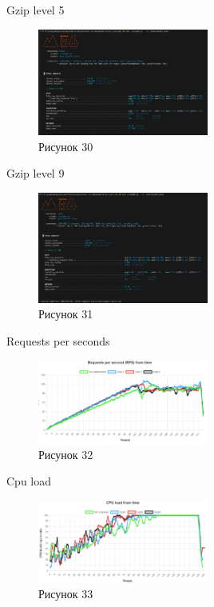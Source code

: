 \documentclass[12pt]{article}
\begin{document}
    Gzip level 5
    \begin{figure}[h!]
        \centering
        \includegraphics[width=0.5\textwidth]{../images/second_part/gzip5_screenshot.png}
        \caption{Рисунок 30}
    \end{figure}

    Gzip level 9
    \begin{figure}[h!]
        \centering
        \includegraphics[width=0.5\textwidth]{../images/second_part/gzip9_screenshot.png}
        \caption{Рисунок 31}
    \end{figure}

    Requests per seconds
    \begin{figure}[h!]
        \centering
        \includegraphics[width=0.5\textwidth]{../images/second_part/RPS.png}
        \caption{Рисунок 32}
    \end{figure}

    Cpu load
    \begin{figure}[h!]
        \centering
        \includegraphics[width=0.5\textwidth]{../images/second_part/CPU_load.png}
        \caption{Рисунок 33}
    \end{figure}
\end{document}
